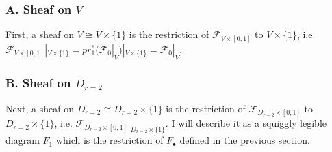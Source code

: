 \subsubsection{A. Sheaf on $V$}
First, a sheaf on $V\cong V\times\{1\}$ is the restriction of $\mathscr{F}_{V\times [0,1]}$ to $V\times \{1\}$, i.e. $\mathscr{F}_{V\times [0,1]}|_{V\times \{1\}}= pr_1^*(\mathscr{F}_0|_V)|_{V\times \{1\}} = \mathscr{F}_0|_V$.
\subsubsection{B. Sheaf on $D_{r=2}$}
Next, a sheaf on $D_{r=2}\cong D_{r=2}\times \{1\}$ is the restriction of $\mathscr{F}_{D_{r=2}\times [0,1]}$ to $D_{r=2}\times \{1\}$, i.e. $\mathscr{F}_{D_{r=2}\times [0,1]} |_{D_{r=2}\times \{1\}}$. I will describe it as a squiggly legible diagram $F_1$ which is the restriction of $F_\bullet$ defined in the previous section.

